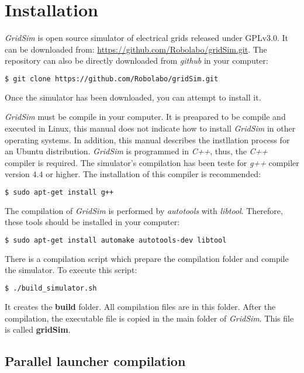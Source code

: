 \chapter{Installation}
\label{chap:installation}

{\it GridSim} is open source simulator of electrical grids released under GPLv3.0.
It can be downloaded from: \href{https://github.com/Robolabo/gridSim.git}{https://github.com/Robolabo/gridSim.git}.
The repository can also be directly downloaded from {\it github} in your computer:
\begin{lstlisting}[language=bash]
  $ git clone https://github.com/Robolabo/gridSim.git
\end{lstlisting}
\noindent
Once the simulator has been downloaded, you can attempt to install it.

{\it GridSim} must be compile in your computer.
It is preapared to be compile and executed in Linux, this manual does not indicate how to install {\it GridSim} in other operating systems.
In addition, this manual describes the instllation process for an Ubuntu distribution.
{\it GridSim} is programmed in {\it C++}, thus, the {\it C++} compiler is required.
The simulator's compilation has been teste for {\it g++} compiler version $4.4$ or higher.
The installation of this compiler is recommended:
\begin{lstlisting}[language=bash]
  $ sudo apt-get install g++
\end{lstlisting}

The compilation of {\it GridSim} is performed by {\it autotools} with {\it libtool}.
Therefore, these tools should be installed in your computer:
\begin{lstlisting}[language=bash]
  $ sudo apt-get install automake autotools-dev libtool
\end{lstlisting}

There is a compilation script which prepare the compilation folder and compile the simulator.
To execute this script:
\begin{lstlisting}[language=bash]
  $ ./build_simulator.sh
\end{lstlisting}
\noindent
It creates the {\bf build} folder.
All compilation files are in this folder.
After the compilation, the executable file is copied in the main folder of {\it GridSim}.
This file is called {\bf gridSim}.

%
\section{Parallel launcher compilation}

